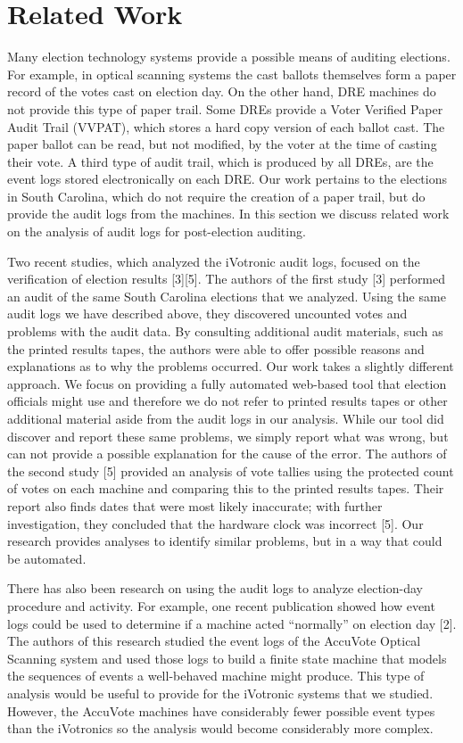 \documentclass[letterpaper,twocolumn,10pt]{article}
\begin{document}
\section{Related Work}
Many election technology systems provide a possible means of auditing elections. For example, in optical scanning systems the cast ballots themselves form a paper record of the votes cast on election day. On the other hand, DRE machines do not provide this type of paper trail. Some DREs provide a Voter Verified Paper Audit Trail (VVPAT), which stores a hard copy version of each ballot cast. The paper ballot can be read, but not modified, by the voter at the time of casting their vote. A third type of audit trail, which is produced by all DREs, are the event logs stored electronically on each DRE. Our work pertains to the elections in South Carolina, which do not require the creation of a paper trail, but do provide the audit logs from the machines. In this section we discuss related work on the analysis of audit logs for post-election auditing.

Two recent studies, which analyzed the iVotronic audit logs, focused on the verification of election results [3][5]. The authors of the first study [3] performed an audit of the same South Carolina elections that we analyzed. Using the same audit logs we have described above, they discovered uncounted votes and problems with the audit data. By consulting additional audit materials, such as the printed results tapes, the authors were able to offer possible reasons and explanations as to why the problems occurred. Our work takes a slightly different approach. We focus on providing a fully automated web-based tool that election officials might use and therefore we do not refer to printed results tapes or other additional material aside from the audit logs in our analysis. While our tool did discover and report these same problems, we simply report what was wrong, but can not provide a possible explanation for the cause of the error. The authors of the second study [5] provided an analysis of vote tallies using the protected count of votes on each machine and comparing this to the printed results tapes. Their report also finds dates that were most likely inaccurate; with further investigation, they concluded that the hardware clock was incorrect [5]. Our research provides analyses to identify similar problems, but in a way that could be automated.

There has also been research on using the audit logs to analyze election-day procedure and activity. For example, one recent publication showed how event logs could be used to determine if a machine acted ``normally'' on election day [2]. The authors of this research studied the event logs of the AccuVote Optical Scanning system and used those logs to build a finite state machine that models the sequences of events a well-behaved machine might produce. This type of analysis would be useful to provide for the iVotronic systems that we studied. However, the AccuVote machines have considerably fewer possible event types than the iVotronics so the analysis would become considerably more complex.
\end{document}
